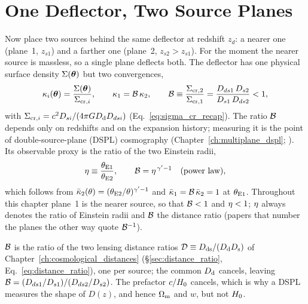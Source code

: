\section{One Deflector, Two Source Planes}
\label{sec:ms_two_sources}

Now place two sources behind the same deflector at redshift $z_d$: a nearer one
(plane~1, $z_{s1}$) and a farther one (plane~2, $z_{s2}>z_{s1}$).  For the
moment the nearer source is massless, so a single plane deflects both.  The
deflector has one physical surface density $\Sigma(\boldsymbol{\theta})$ but two
convergences,
\begin{equation}
    \kappa_i(\boldsymbol{\theta})=\frac{\Sigma(\boldsymbol{\theta})}{\Sigma_{{\rm cr},i}},
    \qquad
    \kappa_1=\mathcal{B}\,\kappa_2,
    \qquad
    \mathcal{B}\equiv\frac{\Sigma_{{\rm cr},2}}{\Sigma_{{\rm cr},1}}
     =\frac{D_{ds1}\,D_{s2}}{D_{s1}\,D_{ds2}}<1 ,
    \label{eq:ms_brat}
\end{equation}
with $\Sigma_{{\rm cr},i}=c^2D_{si}/(4\pi GD_{\mathrm{d}}D_{dsi})$
(Eq.~\ref{eq:sigma_cr_recap}).  The ratio $\mathcal{B}$ depends only on redshifts
and on the expansion history; measuring it is the point of
double-source-plane (DSPL) cosmography (Chapter~\ref{ch:multiplane_dspl};
\citealp{collett_2012,collett_auger_2014}).  Its observable proxy is the ratio
of the two Einstein radii,
\begin{equation}
    \eta\equiv\frac{\theta_{\rm E1}}{\theta_{\rm E2}},
    \qquad
    \mathcal{B}=\eta^{\,\gamma'-1}\quad\text{(power law)},
    \label{eq:ms_eta}
\end{equation}
which follows from $\bar{\kappa}_2(\theta)=(\theta_{\rm E2}/\theta)^{\gamma'-1}$
 and $\bar{\kappa}_1=\mathcal{B}\,\bar{\kappa}_2=1$ at $\theta_{\rm E1}$.
Throughout this chapter plane~1 is the nearer source, so that
$\mathcal{B}<1$ and $\eta<1$; $\eta$ always denotes the ratio of Einstein radii
and $\mathcal{B}$ the distance ratio (papers that number the planes the other way
quote $\mathcal{B}^{-1}$).

\begin{bridge}
$\mathcal{B}$ is the ratio of the two lensing distance ratios
$\mathcal{D}\equiv D_{\mathrm{ds}}/(D_{\mathrm{d}}D_{\mathrm{s}})$ of Chapter~\ref{ch:cosmological_distances}
(\S\ref{sec:distance_ratio}, Eq.~\ref{eq:distance_ratio}), one per source;
the common $D_{\mathrm{d}}$ cancels, leaving $\mathcal{B}=(D_{ds1}/D_{s1})/(D_{ds2}/D_{s2})$.  The prefactor $c/H_0$
cancels, which is why a DSPL measures the shape of $D(z)$, and hence
$\Omega_{\rm m}$ and $w$, but not $H_0$.
\end{bridge}

